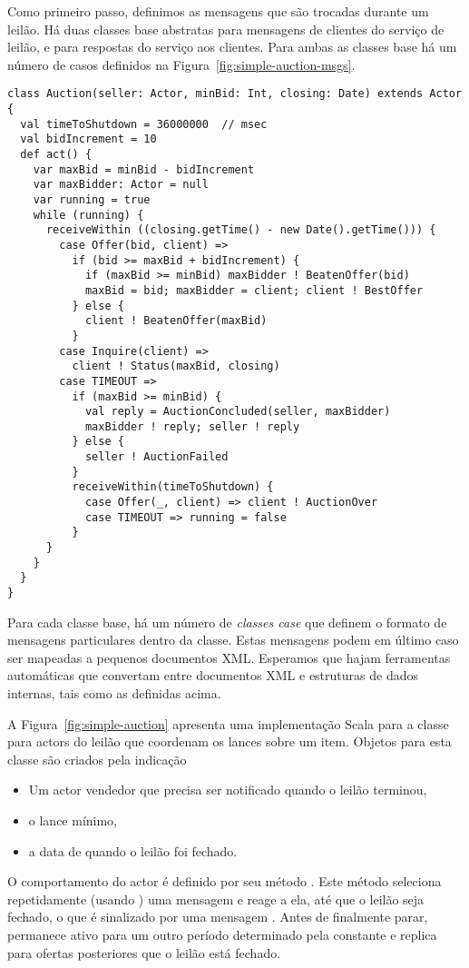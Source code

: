 Como primeiro passo, definimos as mensagens que s\~{a}o trocadas durante um
leil\~{a}o. H\'{a} duas classes base abstratas  para mensagens 
de clientes do servi\c{c}o de leil\~{a}o, e  para respostas 
do servi\c{c}o aos clientes. Para ambas as classes base h\'{a} um n\'{u}mero de casos 
definidos na Figura~\ref{fig:simple-auction-msgs}.

\begin{lstlisting}[style=floating,label=fig:simple-auction,caption=Implementation of an Auction Service]
class Auction(seller: Actor, minBid: Int, closing: Date) extends Actor {
  val timeToShutdown = 36000000  // msec
  val bidIncrement = 10
  def act() {
    var maxBid = minBid - bidIncrement
    var maxBidder: Actor = null
    var running = true
    while (running) {
      receiveWithin ((closing.getTime() - new Date().getTime())) {
        case Offer(bid, client) =>
          if (bid >= maxBid + bidIncrement) { 
            if (maxBid >= minBid) maxBidder ! BeatenOffer(bid)
            maxBid = bid; maxBidder = client; client ! BestOffer
          } else {
            client ! BeatenOffer(maxBid)
          }
        case Inquire(client) =>
          client ! Status(maxBid, closing)
        case TIMEOUT =>
          if (maxBid >= minBid) {
            val reply = AuctionConcluded(seller, maxBidder)
            maxBidder ! reply; seller ! reply
          } else {
            seller ! AuctionFailed
          }
          receiveWithin(timeToShutdown) {
            case Offer(_, client) => client ! AuctionOver
            case TIMEOUT => running = false
          }
      }
    }
  } 
}
\end{lstlisting}

Para cada classe base, h\'{a} um n\'{u}mero de {\em classes case} que definem
o formato de mensagens particulares dentro da classe. Estas mensagens
podem em \'{u}ltimo caso ser mapeadas a pequenos documentos XML. Esperamos
que hajam ferramentas autom\'{a}ticas que convertam entre documentos XML e 
estruturas de dados internas, tais como as definidas acima.

A Figura~\ref{fig:simple-auction} apresenta uma implementa\c{c}\~{a}o Scala para a classe
 para actors do leil\~{a}o que coordenam os lances sobre um item. Objetos
para esta classe s\~{a}o criados pela indica\c{c}\~{a}o
\begin{itemize}
\item Um actor vendedor que precisa ser notificado quando o leil\~{a}o terminou,
\item o lance m\'{i}nimo,
\item a data de quando o leil\~{a}o foi fechado.
\end{itemize}  
O comportamento do actor \'{e} definido por seu m\'{e}todo . Este m\'{e}todo seleciona
repetidamente (usando ) uma mensagem e reage a ela, at\'{e} que o 
leil\~{a}o seja fechado, o que \'{e} sinalizado por uma mensagem . Antes de 
finalmente parar, permanece ativo para um outro per\'{i}odo determinado pela constante 
 e replica para ofertas posteriores que o leil\~{a}o est\'{a} fechado.    

